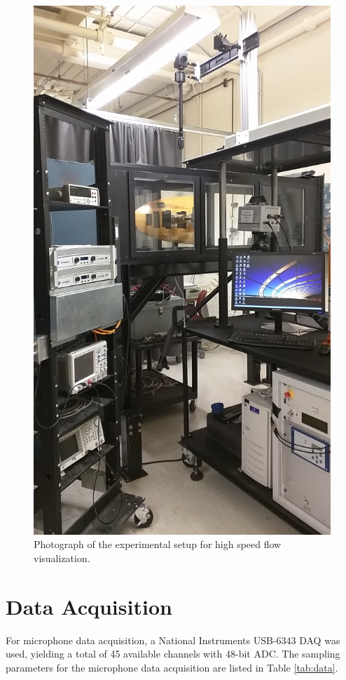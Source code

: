 \begin{figure}
	\begin{center}
		\centerline{\includegraphics[scale=0.2]{figures/flowvis_setup.jpg}}
		\caption{Photograph of the experimental setup for high speed flow visualization.}
		\label{fig:flowvissetup}
	\end{center}
\end{figure}

\section{Data Acquisition}
For microphone data acquisition, a National Instruments USB-6343 DAQ was used, yielding a total of 45 available channels with 48-bit ADC. The sampling parameters for the microphone data acquisition are listed in Table \ref{tab:data}.

